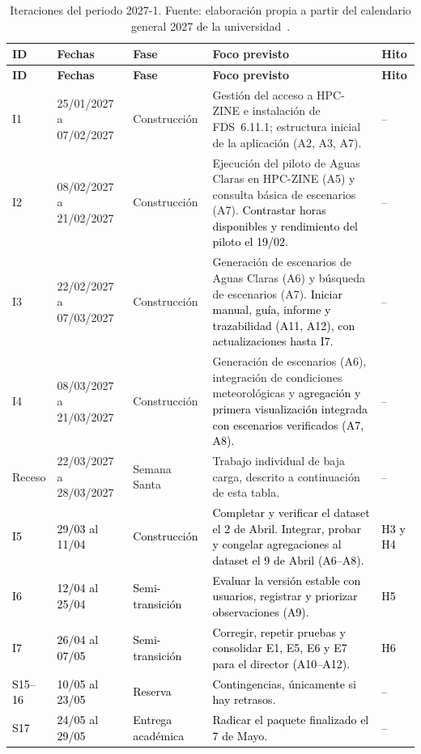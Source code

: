 \begin{longtable}{|p{}|p{}|p{}|p{}|p{}|}
\caption{Iteraciones del periodo 2027-1. Fuente: elaboración propia a partir del calendario general 2027 de la universidad~\cite{javerianaCalendario2027}.}\label{tab:iteraciones}\\
\hline
\textbf{ID} & \textbf{Fechas} & \textbf{Fase} & \textbf{Foco previsto} & \textbf{Hito}\\\hline
\endfirsthead
\hline
\textbf{ID} & \textbf{Fechas} & \textbf{Fase} & \textbf{Foco previsto} & \textbf{Hito}\\\hline
\endhead
I1 & 25/01/2027 a 07/02/2027 & Construcción & Gestión del acceso a HPC-ZINE e instalación de FDS~6.11.1; estructura inicial de la aplicación (A2, A3, A7). & --\\\hline
I2 & 08/02/2027 a 21/02/2027 & Construcción & Ejecución del piloto de Aguas Claras en HPC-ZINE (A5) y consulta básica de escenarios (A7). \textcolor{black}{Contrastar horas disponibles y rendimiento del piloto el 19/02.} & --\\\hline
I3 & 22/02/2027 a 07/03/2027 & Construcción & Generación de escenarios de Aguas Claras (A6) y búsqueda de escenarios (A7). \textcolor{black}{Iniciar manual, guía, informe y trazabilidad (A11, A12), con actualizaciones hasta I7.} & --\\\hline
I4 & 08/03/2027 a 21/03/2027 & Construcción & Generación de escenarios (A6), integración de condiciones meteorológicas y \textcolor{black}{agregación y primera visualización integrada con escenarios verificados (A7, A8).} & --\\\hline
Receso & 22/03/2027 a 28/03/2027 & Semana Santa & Trabajo individual de baja carga, descrito a continuación de esta tabla. & --\\\hline
\textcolor{black}{I5} & \textcolor{black}{29/03 al 11/04} & \textcolor{black}{Construcción} & \textcolor{black}{Completar y verificar \textcolor{black}{el dataset} el 2 de Abril. Integrar, probar y congelar agregaciones \textcolor{black}{al dataset} el 9 de Abril (A6–A8).} & \textcolor{black}{H3 y H4}\\\hline
\textcolor{black}{I6} & \textcolor{black}{12/04 al 25/04} & \textcolor{black}{Semi-transición} & \textcolor{black}{Evaluar la versión estable con usuarios, registrar y priorizar observaciones (A9).} & \textcolor{black}{H5}\\\hline
\textcolor{black}{I7} & \textcolor{black}{26/04 al 07/05} & \textcolor{black}{Semi-transición} & \textcolor{black}{Corregir, repetir pruebas y consolidar E1, E5, E6 y E7 para el director (A10–A12).} & \textcolor{black}{H6}\\\hline
\textcolor{black}{S15–16} & \textcolor{black}{10/05 al 23/05} & \textcolor{black}{Reserva} & \textcolor{black}{Contingencias, únicamente si hay retrasos.} & \textcolor{black}{--}\\\hline
\textcolor{black}{S17} & \textcolor{black}{24/05 al 29/05} & \textcolor{black}{Entrega académica} & \textcolor{black}{Radicar el paquete finalizado el 7 de Mayo.} & \textcolor{black}{--}\\\hline
\end{longtable}

